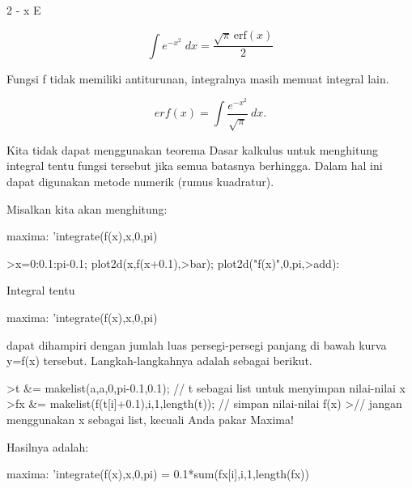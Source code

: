 \documentclass[a4paper,10pt]{article}
\begin{document}
\begin{eulernotebook}
\begin{eulercomment}
\begin{eulercomment}
\begin{eulercomment}
\begin{eulercomment}
\begin{euleroutput}
                                      2
                                   - x
                                  E
  
\end{euleroutput}
\begin{eulerformula}
\[
\int {e^ {- x^2 }}{\;dx}=\frac{\sqrt{\pi}\,\mathrm{erf}\left(x  \right)}{2}
\]
\end{eulerformula}
\begin{eulercomment}
Fungsi f tidak memiliki antiturunan, integralnya masih memuat integral lain.

\end{eulercomment}
\begin{eulerformula}
\[
erf(x) = \int \frac{e^{-x^2}}{\sqrt{\pi}} \ dx.
\]
\end{eulerformula}
\begin{eulercomment}
Kita tidak dapat menggunakan teorema Dasar kalkulus untuk menghitung integral tentu fungsi tersebut jika semua batasnya berhingga.
Dalam hal ini dapat digunakan metode numerik (rumus kuadratur).

Misalkan kita akan menghitung:

maxima: 'integrate(f(x),x,0,pi)
\end{eulercomment}
\begin{eulerprompt}
>x=0:0.1:pi-0.1; plot2d(x,f(x+0.1),>bar); plot2d("f(x)",0,pi,>add):
\end{eulerprompt}
\begin{eulercomment}
Integral tentu

maxima: 'integrate(f(x),x,0,pi)

dapat dihampiri dengan jumlah luas persegi-persegi panjang di bawah kurva y=f(x)
tersebut. Langkah-langkahnya adalah sebagai berikut.
\end{eulercomment}
\begin{eulerprompt}
>t &= makelist(a,a,0,pi-0.1,0.1); // t sebagai list untuk menyimpan nilai-nilai x
>fx &= makelist(f(t[i]+0.1),i,1,length(t)); // simpan nilai-nilai f(x)
>// jangan menggunakan x sebagai list, kecuali Anda pakar Maxima!
\end{eulerprompt}
\begin{eulercomment}
Hasilnya adalah:

maxima: 'integrate(f(x),x,0,pi) = 0.1*sum(fx[i],i,1,length(fx))


\end{eulercomment}
\end{eulercomment}
\end{eulercomment}
\end{eulercomment}
\end{eulercomment}
\end{eulernotebook}
\end{document}
